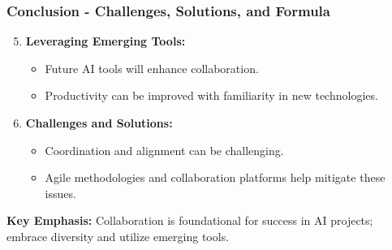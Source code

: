 \documentclass[aspectratio=169]{beamer}
\begin{document}
\begin{frame}[fragile]
    \frametitle{Conclusion - Challenges, Solutions, and Formula}
    \begin{enumerate}
        \setcounter{enumi}{4}
        \item \textbf{Leveraging Emerging Tools:}
            \begin{itemize}
                \item Future AI tools will enhance collaboration.
                \item Productivity can be improved with familiarity in new technologies.
            \end{itemize}
        \item \textbf{Challenges and Solutions:}
            \begin{itemize}
                \item Coordination and alignment can be challenging.
                \item Agile methodologies and collaboration platforms help mitigate these issues.
            \end{itemize}
    \end{enumerate}
    
    
    \textbf{Key Emphasis:} 
    Collaboration is foundational for success in AI projects; embrace diversity and utilize emerging tools.
\end{frame}
\end{document}
